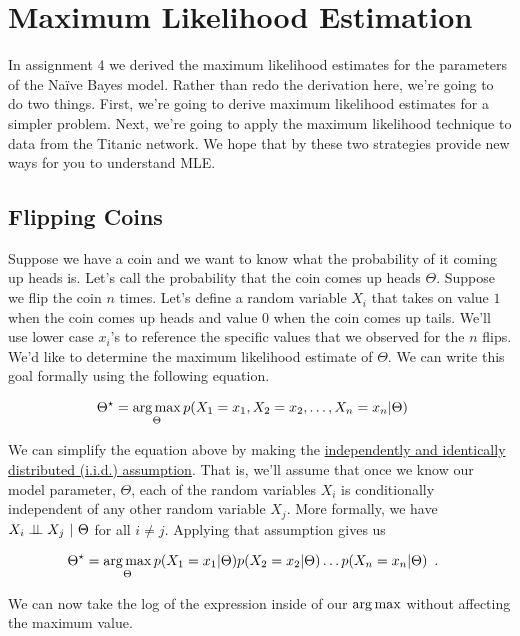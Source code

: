 \documentclass{tufte-handout}
\begin{document}
\section{Maximum Likelihood Estimation}

In assignment 4 we derived the maximum likelihood estimates for the parameters of the Na\"ive Bayes model.  Rather than redo the derivation here, we're going to do two things.  First, we're going to derive maximum likelihood estimates for a simpler problem.  Next, we're going to apply the maximum likelihood technique to data from the Titanic network.  We hope that by these two strategies provide new ways for you to understand MLE.

\subsection{Flipping Coins}

Suppose we have a coin and we want to know what the probability of it coming up heads is.  Let's call the probability that the coin comes up heads $\Theta$.  Suppose we flip the coin $n$ times.  Let's define a random variable $X_i$ that takes on value $1$ when the coin comes up heads and value $0$ when the coin comes up tails.  We'll use lower case $x_i$'s to reference the specific values that we observed for the $n$ flips.  We'd like to determine the maximum likelihood estimate of $\Theta$.  We can write this goal formally using the following equation.


\begin{align}
\Theta^\star &= \operatorname*{arg\,max}_{\Theta} p(X_1 = x_1, X_2 = x_2, \ldots, X_n = x_n | \Theta)
\end{align} 

We can simplify the equation above by making the \href{https://en.wikipedia.org/wiki/Independent_and_identically_distributed_random_variables}{independently and identically distributed (i.i.d.) assumption}.  That is, we'll assume that once we know our model parameter, $\Theta$, each of the random variables $X_i$ is conditionally independent of any other random variable $X_j$.  More formally, we have $X_i \perp\!\!\!\perp X_j~|~\Theta$ for all $i \neq j$.  Applying that assumption gives us

\begin{align}
\Theta^\star &= \operatorname*{arg\,max}_{\Theta} p(X_1 = x_1 | \Theta) p(X_2 = x_2 | \Theta) \ldots p(X_n = x_n | \Theta) \enspace .
\end{align}

We can now take the log of the expression inside of our $\operatorname*{arg\,max}$ without affecting the maximum value.
\end{document}
